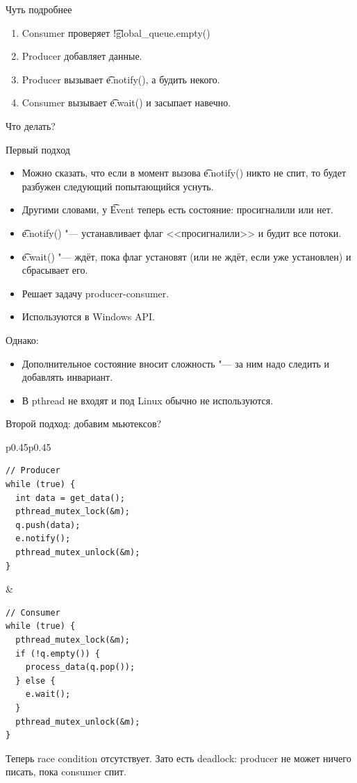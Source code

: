 \begin{frame}{Чуть подробнее}
	\begin{enumerate}
		\item Consumer проверяет \t{!global\_queue.empty()}
		\item Producer добавляет данные.
		\item Producer вызывает \t{e.notify()}, а будить некого.
		\item Consumer вызывает \t{e.wait()} и засыпает навечно.
	\end{enumerate}
	Что делать?
\end{frame}

\begin{frame}{Первый подход}
	\begin{itemize}
		\item Можно сказать, что если в момент вызова \t{e.notify()} никто не спит, то будет разбужен следующий попытающийся уснуть.
		\item Другими словами, у \t{Event} теперь есть состояние: просигналили или нет.
		\item \t{e.notify()} "--- устанавливает флаг <<просигналили>> и будит все потоки.
		\item \t{e.wait()} "--- ждёт, пока флаг установят (или не ждёт, если уже установлен) и сбрасывает его.
		\item Решает задачу producer-consumer.
		\item Используются в Windows API.
	\end{itemize}
	Однако:
	\begin{itemize}
		\item Дополнительное состояние вносит сложность "--- за ним надо следить и добавлять инвариант.
		\item В pthread не входят и под Linux обычно не используются.
	\end{itemize}
\end{frame}

\begin{frame}[fragile]{Второй подход: добавим мьютексов?}
	\begin{tabular}{p{0.45\linewidth}p{0.45\linewidth}}
		\centering
\begin{verbatim}
// Producer
while (true) {
  int data = get_data();
  pthread_mutex_lock(&m);
  q.push(data);
  e.notify();
  pthread_mutex_unlock(&m);
}
\end{verbatim}
&
\begin{verbatim}
// Consumer
while (true) {
  pthread_mutex_lock(&m);
  if (!q.empty()) {
    process_data(q.pop());
  } else {
    e.wait();
  }
  pthread_mutex_unlock(&m);
}
\end{verbatim}
	\end{tabular}
	Теперь race condition отсутствует.
	\pause
	Зато есть deadlock: producer не может ничего писать, пока consumer спит.
\end{frame}

